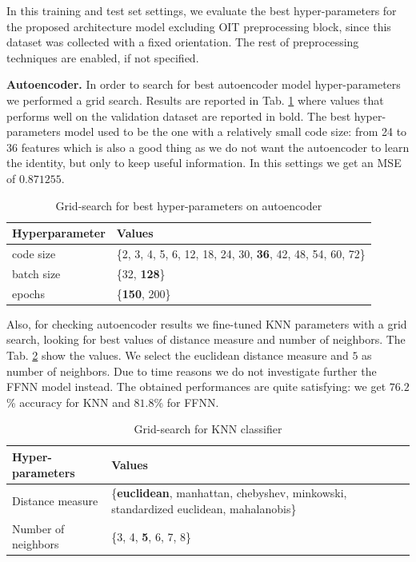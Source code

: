 In this training and test set settings, we evaluate the best
hyper-parameters for the proposed architecture model excluding OIT
preprocessing block, since this dataset was collected with a fixed
orientation. The rest of preprocessing techniques are enabled, if not
specified.

\textbf{Autoencoder.} In order to search for best autoencoder model hyper-parameters we performed a grid search. Results are
reported in Tab. \ref{tab:ae-hyperparams} where values that performs
well on the validation dataset are reported in bold. The best hyper-parameters model
used to be the one with a relatively small code size: from 24 to 36
features which is also a good thing as we do not want the autoencoder
to learn the identity, but only to keep useful information. In this
settings we get an MSE of $0.871255$.
\begin{table}[h]
  \centering
  \begin{tabular}{lp{4cm}}
    \hline
    Hyperparameter & Values \\
    \hline
    code size & \{2, 3, 4, 5, 6, 12, 18, 24, 30, \textbf{36}, 42, 48, 54, 60, 72\} \\
    batch size & \{32, \textbf{128}\} \\
    epochs & \{\textbf{150}, 200\} \\
    \hline
  \end{tabular}
  \caption{Grid-search for best hyper-parameters on autoencoder}
  \label{tab:ae-hyperparams}
\end{table}

Also, for checking autoencoder results we fine-tuned KNN parameters
with a grid search, looking for best values of distance measure and
number of neighbors. The Tab. \ref{tab:knn-grid-search} show the values.
We select the euclidean distance measure and $5$ as number of neighbors.
Due to time reasons we do not investigate further the FFNN model instead.
The obtained performances are quite satisfying: we get $76.2$\% accuracy
for KNN and $81.8$\% for FFNN.
\begin{table}[h]
  \centering
  \begin{tabular}{p{2cm}p{4.5cm}}
    \hline
    Hyper-parameters & Values \\
    \hline
    Distance measure & \{\textbf{euclidean}, manhattan, chebyshev, minkowski, standardized euclidean, mahalanobis\} \\
    Number of neighbors & \{3, 4, \textbf{5}, 6, 7, 8\} \\
    \hline
  \end{tabular}
  \caption{Grid-search for KNN classifier}
  \label{tab:knn-grid-search}
\end{table}

